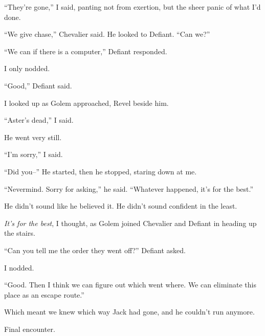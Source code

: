 ``They're gone,'' I said, panting not from exertion, but the sheer panic of what I'd done.



``We give chase,'' Chevalier said.  He looked to Defiant.  ``Can we?''



``We can if there is a computer,'' Defiant responded.



I only nodded.



``Good,'' Defiant said.



I looked up as Golem approached, Revel beside him.



``Aster's dead,'' I said.



He went very still.



``I'm sorry,'' I said.



``Did you--''  He started, then he stopped, staring down at me.



``Nevermind.  Sorry for asking,'' he said.  ``Whatever happened, it's for the best.''



He didn't sound like he believed it.  He didn't sound confident in the least.



\emph{It's for the best}, I thought, as Golem joined Chevalier and Defiant in heading up the stairs.



``Can you tell me the order they went off?''  Defiant asked.



I nodded.



``Good.  Then I think we can figure out which went where.  We can eliminate this place as an escape route.''



Which meant we knew which way Jack had gone, and he couldn't run anymore.



Final encounter.





